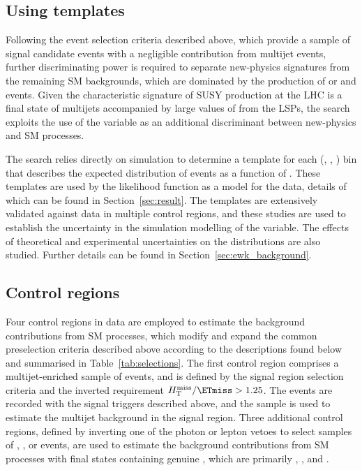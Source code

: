 \subsection{Using \texorpdfstring{\HTmiss}{HTmiss} templates}
\label{sec:mht_templates} 

Following the event selection criteria described above, which provide
a sample of signal candidate events with a negligible contribution
from multijet events, further discriminating power is required to
separate new-physics signatures from the remaining SM backgrounds,
which are dominated by the production of \ttbar or \wlj and \znunuj
events. Given the characteristic signature of SUSY production at the
LHC is a final state of multijets accompanied by large values of
\ptvecmiss from the LSPs, the search exploits the use of the \HTmiss
variable as an additional discriminant between new-physics and SM
processes. 

The search relies directly on simulation to determine a template for
each (\njet, \nb, \scalht) bin that describes the expected
distribution of events as a function of \HTmiss. These templates are
used by the likelihood function as a model for the data, details of
which can be found in Section~\ref{sec:result}. The templates are
extensively validated against data in multiple control regions, and
these studies are used to establish the uncertainty in the simulation
modelling of the \HTmiss variable. The effects of theoretical and
experimental uncertainties on the \HTmiss distributions are also
studied. Further details can be found in
Section~\ref{sec:ewk_background}.


\subsection{Control regions}
\label{sec:control_regions}

Four control regions in data are employed to estimate the background
contributions from SM processes, which modify and expand the common
preselection criteria described above according to the descriptions
found below and summarised in Table~\ref{tab:selections}. The first
control region comprises a multijet-enriched sample of events, and is
defined by the signal region selection criteria and the inverted
requirement $\HTmiss / \ETmiss > 1.25$. The events are recorded with
the signal triggers described above, and the sample is used to
estimate the multijet background in the signal region. Three
additional control regions, defined by inverting one of the photon or
lepton vetoes to select samples of \gj, \mj, or \mmj events, are used
to estimate the background contributions from SM processes with final
states containing genuine \ptvecmiss, which are primarily \ttbar,
\wlj, and \znunuj.

